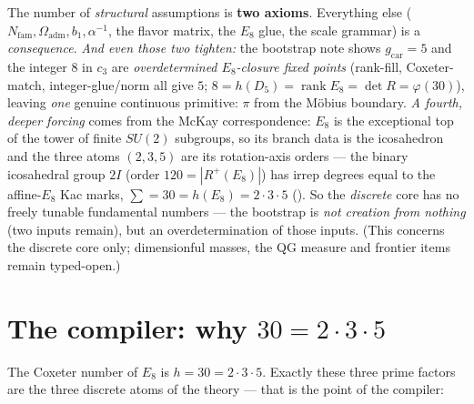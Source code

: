 \documentclass[11pt,a4paper]{article}
\newcommand{\cthree}{c_3}
\newcommand{\gcar}{g_{\mathrm{car}}}
\newcommand{\Nfam}{N_{\mathrm{fam}}}
\newcommand{\Oadm}{\Omega_{\mathrm{adm}}}
\newcommand{\ainv}{\alpha^{-1}}
\newcommand{\Z}{\mathbb{Z}}
\begin{document}
\begin{winboxnb}
The number of \emph{structural} assumptions is \textbf{two axioms}. Everything else
($\Nfam,\Oadm,b_1,\ainv$, the flavor matrix, the $E_8$ glue, the scale grammar) is a
\emph{consequence}. \emph{And even those two tighten:} the
bootstrap note shows $\gcar=5$ and the integer $8$ in $\cthree$ are \emph{overdetermined $E_8$-closure
fixed points} (rank-fill, Coxeter-match, integer-glue/norm all give $5$; $8=h(D_5)=\operatorname{rank}E_8=\det R=\varphi(30)$),
leaving \emph{one} genuine continuous primitive: $\pi$ from the Möbius boundary. \emph{A fourth, deeper
forcing} comes from the McKay correspondence: $E_8$ is the exceptional top of the tower of finite $SU(2)$
subgroups, so its branch data is the icosahedron and the three atoms $(2,3,5)$ are its rotation-axis orders
--- the binary icosahedral group $2I$ (order $120=|R^+(E_8)|$) has irrep degrees equal to the affine-$E_8$
Kac marks, $\sum=30=h(E_8)=2{\cdot}3{\cdot}5$ (). So the \emph{discrete}
core has no freely tunable fundamental numbers --- the bootstrap is \emph{not creation from nothing} (two
inputs remain), but an overdetermination of those inputs. (This concerns the discrete core only;
dimensionful masses, the QG measure and frontier items remain typed-open.)
   
\end{winboxnb}

\section{The compiler: why $30=2\cdot3\cdot5$}
The Coxeter number of $E_8$ is $h=30=2\cdot3\cdot5$. Exactly these three prime factors are the three
discrete atoms of the theory --- that is the point of the compiler:

\begin{center}
\end{center}
\end{document}

